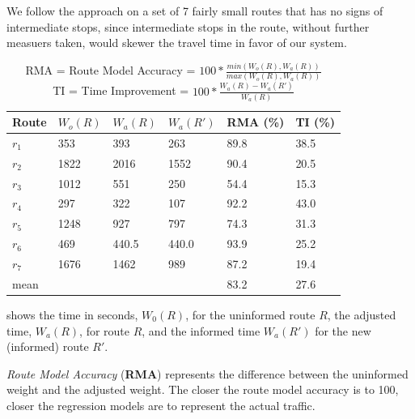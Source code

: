 We follow the approach on a set of 7 fairly small routes that has no signs of intermediate stops, since intermediate stops in the route, without further measuers taken, would skewer the travel time in favor of our system. 
\begin{table}[]
\centering
\begin{tabular}{llllll}
\textbf{Route} & \textbf{$W_o(R)$} & \textbf{$W_a(R)$}  & \textbf{$W_a(R')$} & \textbf{RMA (\%)} & \textbf{TI (\%)} \\ \hline
$r_1$          & 353               & 393                & 263                & 89.8                         & 38.5 \\
$r_2$          & 1822              & 2016               & 1552               & 90.4                         & 20.5 \\
$r_3$          & 1012              & 551                & 250                & 54.4                         & 15.3 \\
$r_4$          & 297               & 322                & 107                & 92.2                         & 43.0 \\
$r_5$          & 1248              & 927                & 797                & 74.3                         & 31.3 \\
$r_6$          & 469               & 440.5              & 440.0              & 93.9                         & 25.2 \\
$r_7$          & 1676              & 1462               & 989                & 87.2                         & 19.4 \\ \hline
mean       	   &                   &                    &                    & 83.2                         & 27.6
\end{tabular}
\caption{RMA = Route Model Accuracy = $100 * \frac{min(W_o(R), W_a(R))}{max(W_o(R), W_a(R))}$\\
	     TI = Time Improvement = $100 * \frac{W_a(R) - W_a(R')}{W_a(R)}$}
\label{tab:eval-results}
\end{table}

 shows the time in seconds, $W_0(R)$, for the uninformed route $R$, the adjusted time, $W_a(R)$, for route $R$, and the informed time $W_a(R')$ for the new (informed) route $R'$.

\emph{Route Model Accuracy } (\textbf{RMA}) represents the difference between the uninformed weight and the adjusted weight. The closer the route model accuracy is to 100, closer the regression models are to represent the actual traffic.
 
